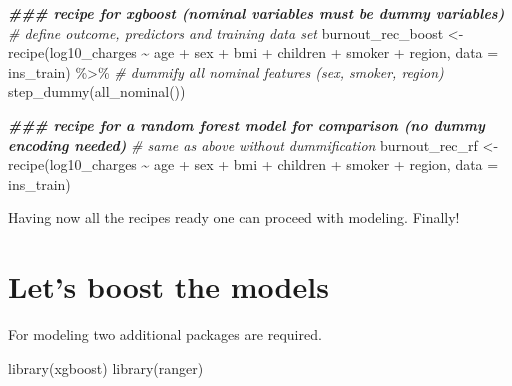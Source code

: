 \documentclass[
]{book}
\newenvironment{Shaded}{\begin{snugshade}}{\end{snugshade}}
\newcommand{\AttributeTok}[1]{\textcolor[rgb]{0.77,0.63,0.00}{#1}}
\newcommand{\CommentTok}[1]{\textcolor[rgb]{0.56,0.35,0.01}{\textit{#1}}}
\newcommand{\DocumentationTok}[1]{\textcolor[rgb]{0.56,0.35,0.01}{\textbf{\textit{#1}}}}
\newcommand{\FunctionTok}[1]{\textcolor[rgb]{0.00,0.00,0.00}{#1}}
\newcommand{\NormalTok}[1]{#1}
\newcommand{\OtherTok}[1]{\textcolor[rgb]{0.56,0.35,0.01}{#1}}
\newcommand{\SpecialCharTok}[1]{\textcolor[rgb]{0.00,0.00,0.00}{#1}}
\begin{document}
\begin{Shaded}
\begin{Highlighting}[]
\DocumentationTok{\#\#\# recipe for xgboost (nominal variables must be dummy variables)}
\CommentTok{\# define outcome, predictors and training data set}
\NormalTok{burnout\_rec\_boost }\OtherTok{\textless{}{-}} \FunctionTok{recipe}\NormalTok{(log10\_charges }\SpecialCharTok{\textasciitilde{}}\NormalTok{ age }\SpecialCharTok{+}\NormalTok{ sex }\SpecialCharTok{+}
\NormalTok{                            bmi }\SpecialCharTok{+}\NormalTok{ children }\SpecialCharTok{+}
\NormalTok{                            smoker }\SpecialCharTok{+}\NormalTok{ region,}
                            \AttributeTok{data =}\NormalTok{ ins\_train) }\SpecialCharTok{\%\textgreater{}\%}
  \CommentTok{\# dummify all nominal features (sex, smoker, region)}
  \FunctionTok{step\_dummy}\NormalTok{(}\FunctionTok{all\_nominal}\NormalTok{())}

\DocumentationTok{\#\#\# recipe for a random forest model for comparison (no dummy encoding needed)}
\CommentTok{\# same as above without dummification}
\NormalTok{burnout\_rec\_rf }\OtherTok{\textless{}{-}} \FunctionTok{recipe}\NormalTok{(log10\_charges }\SpecialCharTok{\textasciitilde{}}\NormalTok{ age }\SpecialCharTok{+}\NormalTok{ sex }\SpecialCharTok{+}
\NormalTok{                         bmi }\SpecialCharTok{+}\NormalTok{ children }\SpecialCharTok{+}
\NormalTok{                         smoker }\SpecialCharTok{+}\NormalTok{ region,}
                         \AttributeTok{data =}\NormalTok{ ins\_train)}
\end{Highlighting}
\end{Shaded}

Having now all the recipes ready one can proceed with modeling. Finally!

\hypertarget{modeling}{%
\chapter{Let's boost the models}\label{modeling}}

For modeling two additional packages are required.\citep[\citet{ranger_package}]{xgboost_package}

\begin{Shaded}
\begin{Highlighting}[]
\FunctionTok{library}\NormalTok{(xgboost)}
\FunctionTok{library}\NormalTok{(ranger)}
\end{Highlighting}
\end{Shaded}
\end{document}
